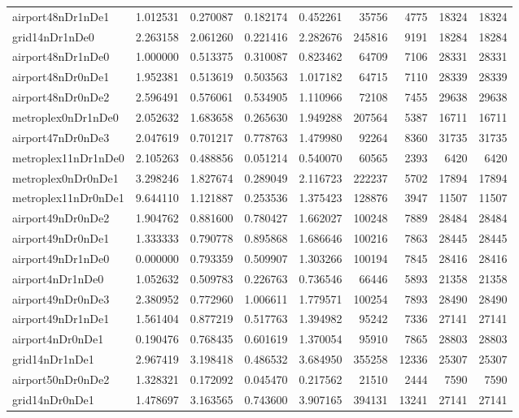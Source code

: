 \begin{longtable}{|l|r|r|r|r|r|r|r|r|}
airport48nDr1nDe1 & 1.012531 & 0.270087 & 0.182174 & 0.452261 & 35756 & 4775 & 18324 & 18324 \\
grid14nDr1nDe0 & 2.263158 & 2.061260 & 0.221416 & 2.282676 & 245816 & 9191 & 18284 & 18284 \\
airport48nDr1nDe0 & 1.000000 & 0.513375 & 0.310087 & 0.823462 & 64709 & 7106 & 28331 & 28331 \\
airport48nDr0nDe1 & 1.952381 & 0.513619 & 0.503563 & 1.017182 & 64715 & 7110 & 28339 & 28339 \\
airport48nDr0nDe2 & 2.596491 & 0.576061 & 0.534905 & 1.110966 & 72108 & 7455 & 29638 & 29638 \\
metroplex0nDr1nDe0 & 2.052632 & 1.683658 & 0.265630 & 1.949288 & 207564 & 5387 & 16711 & 16711 \\
airport47nDr0nDe3 & 2.047619 & 0.701217 & 0.778763 & 1.479980 & 92264 & 8360 & 31735 & 31735 \\
metroplex11nDr1nDe0 & 2.105263 & 0.488856 & 0.051214 & 0.540070 & 60565 & 2393 & 6420 & 6420 \\
metroplex0nDr0nDe1 & 3.298246 & 1.827674 & 0.289049 & 2.116723 & 222237 & 5702 & 17894 & 17894 \\
metroplex11nDr0nDe1 & 9.644110 & 1.121887 & 0.253536 & 1.375423 & 128876 & 3947 & 11507 & 11507 \\
airport49nDr0nDe2 & 1.904762 & 0.881600 & 0.780427 & 1.662027 & 100248 & 7889 & 28484 & 28484 \\
airport49nDr0nDe1 & 1.333333 & 0.790778 & 0.895868 & 1.686646 & 100216 & 7863 & 28445 & 28445 \\
airport49nDr1nDe0 & 0.000000 & 0.793359 & 0.509907 & 1.303266 & 100194 & 7845 & 28416 & 28416 \\
airport4nDr1nDe0 & 1.052632 & 0.509783 & 0.226763 & 0.736546 & 66446 & 5893 & 21358 & 21358 \\
airport49nDr0nDe3 & 2.380952 & 0.772960 & 1.006611 & 1.779571 & 100254 & 7893 & 28490 & 28490 \\
airport49nDr1nDe1 & 1.561404 & 0.877219 & 0.517763 & 1.394982 & 95242 & 7336 & 27141 & 27141 \\
airport4nDr0nDe1 & 0.190476 & 0.768435 & 0.601619 & 1.370054 & 95910 & 7865 & 28803 & 28803 \\
grid14nDr1nDe1 & 2.967419 & 3.198418 & 0.486532 & 3.684950 & 355258 & 12336 & 25307 & 25307 \\
airport50nDr0nDe2 & 1.328321 & 0.172092 & 0.045470 & 0.217562 & 21510 & 2444 & 7590 & 7590 \\
grid14nDr0nDe1 & 1.478697 & 3.163565 & 0.743600 & 3.907165 & 394131 & 13241 & 27141 & 27141 \\

\end{longtable}
